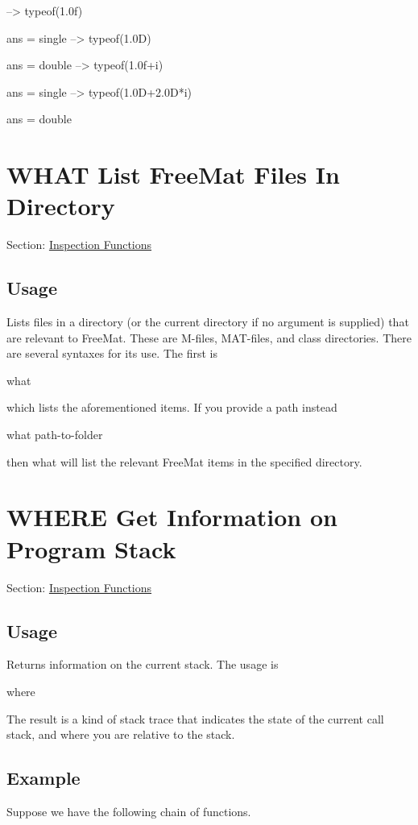 \begin{DoxyVerbInclude}
--> typeof(1.0f)

ans = 
single
--> typeof(1.0D)

ans = 
double
--> typeof(1.0f+i)

ans = 
single
--> typeof(1.0D+2.0D*i)

ans = 
double
\end{DoxyVerbInclude}
 \hypertarget{inspection_what}{}\section{W\-H\-A\-T List Free\-Mat Files In Directory}\label{inspection_what}
Section\-: \hyperlink{sec_inspection}{Inspection Functions} \hypertarget{vtkwidgets_vtkxyplotwidget_Usage}{}\subsection{Usage}\label{vtkwidgets_vtkxyplotwidget_Usage}
Lists files in a directory (or the current directory if no argument is supplied) that are relevant to Free\-Mat. These are {\ttfamily M}-\/files, {\ttfamily M\-A\-T}-\/files, and class directories. There are several syntaxes for its use. The first is \begin{DoxyVerb}   what
\end{DoxyVerb}
 which lists the aforementioned items. If you provide a path instead \begin{DoxyVerb}   what path-to-folder
\end{DoxyVerb}
 then {\ttfamily what} will list the relevant Free\-Mat items in the specified directory. \hypertarget{inspection_where}{}\section{W\-H\-E\-R\-E Get Information on Program Stack}\label{inspection_where}
Section\-: \hyperlink{sec_inspection}{Inspection Functions} \hypertarget{vtkwidgets_vtkxyplotwidget_Usage}{}\subsection{Usage}\label{vtkwidgets_vtkxyplotwidget_Usage}
Returns information on the current stack. The usage is \begin{DoxyVerb}   where
\end{DoxyVerb}
 The result is a kind of stack trace that indicates the state of the current call stack, and where you are relative to the stack. \hypertarget{variables_struct_Example}{}\subsection{Example}\label{variables_struct_Example}
Suppose we have the following chain of functions.


